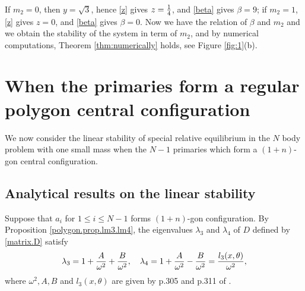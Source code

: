 \documentclass[11pt]{article}
\def\lm{{\lambda}}
\begin{document}
If $m_2=0$, then $y=\sqrt{3}$, hence \eqref{z} gives $z={1\over4}$,
and \eqref{beta} gives $\beta=9$;
if $m_2=1$, \eqref{z} gives $z=0$,
and \eqref{beta} gives $\beta=0$.
Now we have the relation of $\beta$ and $m_2$ and we obtain the stability of the system in term of $m_2$,  and 
by numerical computations,
Theorem \ref{thm:numerically} holds,
see Figure \ref{fig:1}(b).







\setcounter{equation}{0}%
\section{When the primaries form a regular polygon central configuration}\label{sec:4}

We now consider the linear stability of special relative equilibrium in the $N$ body problem with one small mass when the $N-1$ primaries which form a $(1+n)$-gon central configuration. 

\subsection{Analytical results on the linear stability}

Suppose that $a_i$ for $1\leq i\leq N-1$ forms $(1+n)$-gon configuration. 
By Proposition \ref{polygon.prop.lm3.lm4},
the eigenvalues $\lm_3$ and $\lm_4$ of $D$ defined by \eqref{matrix.D} satisfy
\begin{align}
	\lm_3 = 1+{A\over\omega^2}+{B\over\omega^2},\quad
	\lm_4 = 1+{A\over\omega^2}-{B\over\omega^2}={l_3(x,\theta)\over\omega^2},
\end{align}
where  $\omega^2,A,B$ and $l_3(x,\theta)$ are given by p.305 and p.311 of \cite{BaE}.
\end{document}
